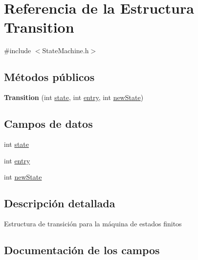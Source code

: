 \hypertarget{structTransition}{}\section{Referencia de la Estructura Transition}
\label{structTransition}


{\ttfamily \#include $<$State\+Machine.\+h$>$}

\subsection*{Métodos públicos}
\begin{DoxyCompactItemize}
\item 
\hypertarget{structTransition_a8ff1179926e5771d232d81961ac69017}{}{\bfseries Transition} (int \hyperlink{structTransition_ad7509cc6401e1038e17dbeea187c15ca}{state}, int \hyperlink{structTransition_a71bfb2883c7991812e7fb3b34e258aab}{entry}, int \hyperlink{structTransition_a423a2791bbcafadc339eaa3da7c7fb04}{new\+State})\label{structTransition_a8ff1179926e5771d232d81961ac69017}

\end{DoxyCompactItemize}
\subsection*{Campos de datos}
\begin{DoxyCompactItemize}
\item 
int \hyperlink{structTransition_ad7509cc6401e1038e17dbeea187c15ca}{state}
\item 
int \hyperlink{structTransition_a71bfb2883c7991812e7fb3b34e258aab}{entry}
\item 
int \hyperlink{structTransition_a423a2791bbcafadc339eaa3da7c7fb04}{new\+State}
\end{DoxyCompactItemize}


\subsection{Descripción detallada}
Estructura de transición para la máquina de estados finitos 

\subsection{Documentación de los campos}
\hypertarget{structTransition_a71bfb2883c7991812e7fb3b34e258aab}{}
